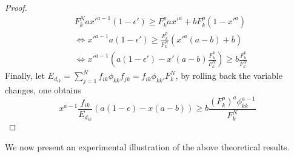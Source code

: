 \begin{proof}
\begin{align*}
&F_k^N a x'^{a-1} (1-\epsilon') \geq F_k^p a x'^a + b F_k^p (1-x'^a) \\
&\Leftrightarrow x'^{a-1} a(1-\epsilon') \geq \frac{F_k^p}{F_k^N} ( x'^a(a-b) + b) \\
&\Leftrightarrow x'^{a-1} \left(a(1-\epsilon') - x'(a-b)\frac{F_k^p}{F_k^N} \right) \geq b \frac{F_k^p}{F_k^N}
\end{align*}
Finally, let $E_{d_{ik}}=\sum_{j=1}^N f_{ik}\phi_{kk}f_{jk}=f_{ik}\phi_{kk'}F_k^N$, by rolling back the variable changes,  one obtains
\begin{equation*}
x^{a-1}\frac{f_{ik}}{E_{d_{ik}}}\left(a(1-\epsilon) -x(a-b) \right) \geq b\frac{(F_k^p)^{a}\phi_{kk}^{a-1}}{F_k^N}
\end{equation*}


\end{proof}


We now present an experimental illustration of the above theoretical results.



